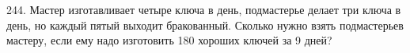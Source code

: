 244. Мастер изготавливает четыре ключа в день, подмастерье делает три ключа в день, но каждый пятый выходит бракованный. Сколько нужно взять подмастерьев мастеру, если ему надо изготовить 180 хороших ключей за 9 дней?\\
